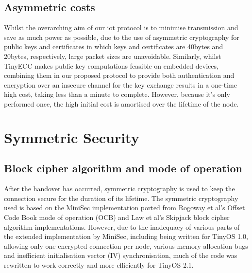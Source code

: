 \documentclass[conference]{./sty/IEEEtran}
\begin{document}
\subsection{Asymmetric costs} %
\label{sub:asymmetric_payload_sizes}
Whilst the overarching aim of our iot protocol is to minimise transmission and save as much power as possible, due to the use of asymmetric cryptography for public keys and certificates in which keys and certificates are 40bytes and 20bytes, respectively, large packet sizes are unavoidable. Similarly, whilst TinyECC makes public key computations feasible on embedded devices, combining them in our proposed protocol to provide both authentication and encryption over an insecure channel for the key exchange results in a one-time high cost, taking less than a minute to complete. However, because it's only performed once, the high initial cost is amortised over the lifetime of the node. 

\section{Symmetric Security} %
\label{sec:symmetric_security}
\subsection{Block cipher algorithm and mode of operation} %
\label{sub:cipher_block_algorithm_and_mode_of_operation}
After the handover has occurred, symmetric cryptography is used to keep the connection secure for the duration of its lifetime. The symmetric cryptography used is based on the MiniSec implementation ported from Rogoway et al's Offset Code Book mode of operation (OCB)\cite{OCB} and Law et al's Skipjack block cipher algorithm\cite{Skipjack} implementations. However, due to the inadequacy of various parts of the extended implementation by MiniSec\cite{MiniSecLink}, including being written for TinyOS 1.0, allowing only one encrypted connection per node, various memory allocation bugs and inefficient initialisation vector (IV) synchronisation, much of the code was rewritten to work correctly and more efficiently for TinyOS 2.1. 
\end{document}
